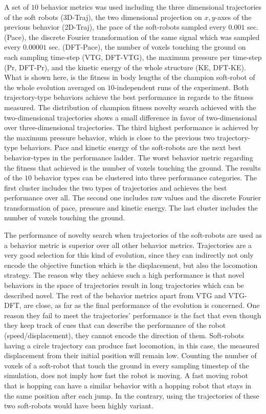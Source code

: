 A set of $10$ behavior metrics was used including the three dimensional trajectories of the soft robots (3D-Traj), the two dimensional projection on $x,y$-axes of the previous behavior (2D-Traj), the pace of the soft-robots sampled every $0.001$ sec. (Pace), the discrete Fourier transformation of the same signal which was sampled every $0.00001$ sec. (DFT-Pace), the number of voxels touching the ground on each sampling time-step (VTG, DFT-VTG), the maximum pressure per time-step (Pr, DFT-Pr), and the kinetic energy of the whole structure (KE, DFT-KE). What is shown here, is the fitness in body lengths of the champion soft-robot of the whole evolution averaged on $10$-independent runs of the experiment. Both trajectory-type behaviors achieve the best performance in regards to the fitness measured. The distribution of champion fitness novelty search achieved with the two-dimensional trajectories shows a small difference in favor of two-dimensional over three-dimensional trajectories. The third highest performance is achieved by the maximum pressure behavior, which is close to the previous two trajectory-type behaviors. Pace and kinetic energy of the soft-robots are the next best behavior-types in the performance ladder. The worst behavior metric regarding the fitness that achieved is the number of voxels touching the ground. The results of the $10$ behavior types can be clustered into three performance categories. The first cluster includes the two types of trajectories and achieves the best performance over all. The second one includes raw values and the discrete Fourier transformation of pace, pressure and kinetic energy. The last cluster includes the number of voxels touching the ground. 

The performance of novelty search when trajectories of the soft-robots are used as a behavior metric is superior over all other behavior metrics. Trajectories are a very good selection for this kind of evolution, since they can indirectly not only encode the objective function which is the displacement, but also the locomotion strategy. The reason why they achieve such a high performance is that novel behaviors in the space of trajectories result in long trajectories which can be described novel. The rest of the behavior metrics apart from VTG and VTG-DFT, are close, as far as the final performance of the evolution is concerned. One reason they fail to meet the trajectories' performance is the fact that even though they keep track of cues that can describe the performance of the robot (speed/displacement), they cannot encode the direction of them. Soft-robots having a circle trajectory can produce fast locomotion, in this case, the measured displacement from their initial position will remain low. Counting the number of voxels of a soft-robot that touch the ground in every sampling timestep of the simulation, does not imply how fast the robot is moving. A fast moving robot that is hopping can have a similar behavior with a hopping robot that stays in the same position after each jump. In the contrary, using the trajectories of these two soft-robots would have been highly variant. 

